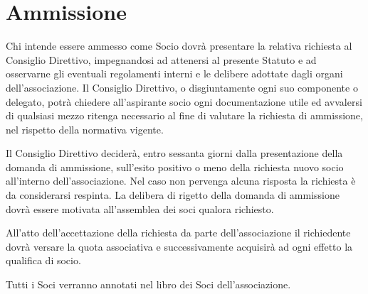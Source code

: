 \documentclass[legalpaper, 11pt]{exam}
\let\tempone\enumerate
\let\temptwo\endenumerate
\renewenvironment{enumerate}{\tempone\addtolength{\itemsep}{-0.45\baselineskip}}{\temptwo}
\begin{document}
\section{Ammissione}
\begin{enumerate}
 \item Chi intende essere ammesso come Socio dovrà presentare la relativa richiesta al Consiglio Direttivo, impegnandosi ad attenersi al presente Statuto e ad osservarne gli eventuali regolamenti interni e le delibere adottate dagli organi dell’associazione. Il Consiglio Direttivo, o disgiuntamente ogni suo componente o delegato, potrà chiedere all’aspirante socio ogni documentazione utile ed avvalersi di qualsiasi mezzo ritenga necessario al fine di valutare la richiesta di ammissione, nel rispetto della normativa vigente.
 \item Il Consiglio Direttivo deciderà, entro sessanta giorni dalla presentazione della domanda di ammissione, sull’esito positivo o meno della richiesta nuovo socio all’interno dell’associazione. Nel caso non pervenga alcuna risposta la richiesta è da considerarsi respinta. La delibera di rigetto della domanda di ammissione dovrà essere motivata all’assemblea dei soci qualora richiesto.
 \item All’atto dell’accettazione della richiesta da parte dell’associazione il richiedente dovrà versare la quota associativa e successivamente acquisirà ad ogni effetto la qualifica di socio.
 \item Tutti i Soci verranno annotati nel libro dei Soci dell’associazione.
\end{enumerate}
\end{document}
